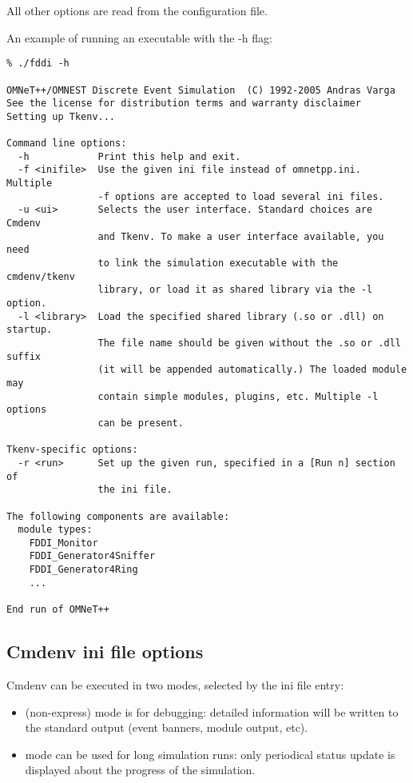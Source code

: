 All other options are read from the configuration file.

An example of running an {\opp} executable with the -h flag:

\begin{verbatim}
% ./fddi -h

OMNeT++/OMNEST Discrete Event Simulation  (C) 1992-2005 Andras Varga
See the license for distribution terms and warranty disclaimer
Setting up Tkenv...

Command line options:
  -h            Print this help and exit.
  -f <inifile>  Use the given ini file instead of omnetpp.ini. Multiple
                -f options are accepted to load several ini files.
  -u <ui>       Selects the user interface. Standard choices are Cmdenv
                and Tkenv. To make a user interface available, you need
                to link the simulation executable with the cmdenv/tkenv
                library, or load it as shared library via the -l option.
  -l <library>  Load the specified shared library (.so or .dll) on startup.
                The file name should be given without the .so or .dll suffix
                (it will be appended automatically.) The loaded module may
                contain simple modules, plugins, etc. Multiple -l options
                can be present.

Tkenv-specific options:
  -r <run>      Set up the given run, specified in a [Run n] section of
                the ini file.

The following components are available:
  module types:
    FDDI_Monitor
    FDDI_Generator4Sniffer
    FDDI_Generator4Ring
    ...

End run of OMNeT++
\end{verbatim}


\subsection{Cmdenv ini file options}
\label{sec:ch-run-sim:cmdenv-section}

Cmdenv can be executed in two modes, selected by the  ini file entry:

\begin{itemize}
    \item {} (non-express) mode is for debugging: detailed information
        will be written to the standard output (event banners, module output,
        etc).
    \item {} mode can be used for long simulation runs: only
        periodical status update is displayed about the progress of the
        simulation.
\end{itemize}

